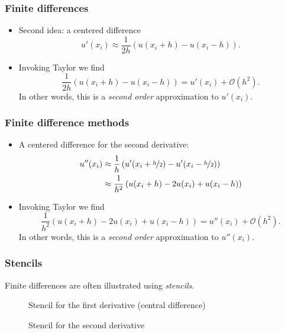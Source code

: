 \begin{frame}
  \frametitle{Finite differences}
  \begin{itemize}
  \item Second idea: a centered difference
    \[
      u'(x_i) \approx \frac{1}{2h} \left( u(x_i + h) - u(x_i - h) \right).
    \]
  \item Invoking Taylor we find
    \[
      \frac{1}{2h} \left( u(x_i + h) - u(x_i - h) \right)
      = u'(x_i) + \mathcal{O}(h^2).
    \]
    In other words, this is a \emph{second order} approximation to $u'(x_i)$.
  \end{itemize}
\end{frame}

\begin{frame}
  \frametitle{Finite difference methods}
  \begin{itemize}
  \item A centered difference for the second derivative:
    \begin{align*}
      u''(x_i) &\approx \frac{1}{h}\left( u'(x_i + \nicefrac{h}{2}) - u'(x_i - \nicefrac{h}{2})\right) \\
      &\approx \frac{1}{h^2}\left( u(x_i + h) - 2u(x_i) + u(x_i - h) \right)
    \end{align*}
  \item Invoking Taylor we find
    \[
      \frac{1}{h^2}\left( u(x_i + h) - 2u(x_i) + u(x_i - h) \right)
      = u''(x_i) + \mathcal{O}(h^2).
    \]
    In other words, this is a \emph{second order} approximation to $u''(x_i)$.
  \end{itemize}
\end{frame}

\begin{frame}
  \frametitle{Stencils}
  Finite differences are often illustrated using \emph{stencils}.
  \begin{figure}
    \begin{center}
      
    \end{center}
    \caption{Stencil for the first derivative (central difference)}
  \end{figure}
  \begin{figure}
    \begin{center}
      
    \end{center}
    \caption{Stencil for the second derivative}
  \end{figure}
\end{frame}


